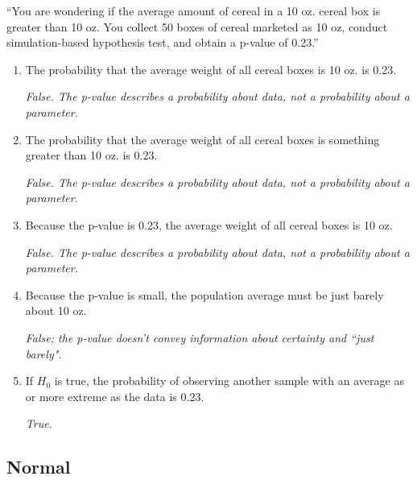\documentclass[12pt]{article}   	%
\newcommand{\soln}[2]{\textit{\textcolor{custom_red}{#2}}}{}
\begin{document}
\begin{enumerate}
  ``You are wondering if the average amount of cereal in a 10 oz. cereal
  box is greater than 10 oz. You collect 50 boxes of cereal marketed as
  10 oz, conduct simulation-based hypothesis test, and obtain a p-value
  of 0.23.''

  \begin{enumerate}
  \item
    The probability that the average weight of all cereal boxes is 10
    oz. is 0.23. 
    
    \soln{}{False. The p-value describes a probability about data, not a probability about a
parameter.}
  \item
    The probability that the average weight of all cereal boxes is
    something greater than 10 oz. is 0.23.
    
    \soln{}{False. The p-value describes a probability about data, not a probability about a
parameter.}
    
  \item
    Because the p-value is 0.23, the average weight of all cereal boxes
    is 10 oz.
    
    \soln{}{False. The p-value describes a probability about data, not a probability about a
parameter.}
 
  \item
    Because the p-value is small, the population average must be just
    barely about 10 oz.
    
    \soln{}{False; the p-value doesn't convey information about certainty and ``just barely".}
  \item
    If $H_{0}$ is true, the probability of observing another sample
    with an average as or more extreme as the data is 0.23.
    
    \soln{}{True.}
    
  \end{enumerate}
\end{enumerate}

\subsection*{Normal}
\end{document}
